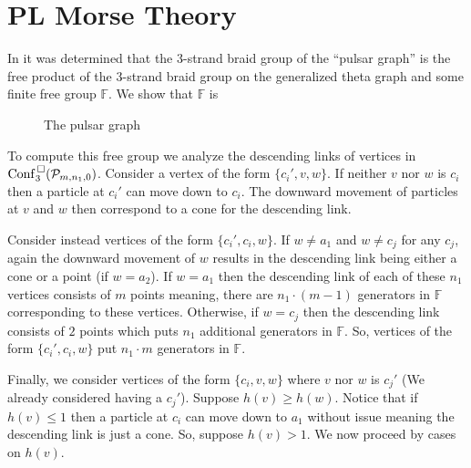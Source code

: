 \chapter{PL Morse Theory}
In \cite{appiah2024algebraicstructurehyperbolicgraph} it was determined that the 3-strand braid group of the ``pulsar graph''
is the free product of the 3-strand braid group on the generalized theta graph and some finite free group \(\mathbb{F}\).
We show that \(\mathbb{F}\) is %

\begin{figure}
\centering
\begin{tikzpicture}
\end{tikzpicture}
\label{fig:pulsargraph}
\caption{The pulsar graph}
\end{figure}

To compute this free group we analyze the descending links of vertices in \(\DConf_3(\mathcal{P}_{m,n_1,0})\).
Consider a vertex of the form \(\{c_i', v, w\}\).
If neither \(v\) nor \(w\) is \(c_i\)
then a particle at \(c_i'\) can move down to \(c_i\).
The downward movement of particles at \(v\) and \(w\) then correspond to a cone for the descending link.

Consider instead vertices of the form \(\{c_i', c_i, w\}\).
If \(w \neq a_1\) and \(w \neq c_j\) for any \(c_j\),
again the downward movement of \(w\) results in the descending link being either a cone or a point (if \(w = a_2\)).
If \(w = a_1\) then the descending link of each of these \(n_1\) vertices consists of \(m\) points
meaning, there are \(n_1 \cdot (m - 1)\) generators in \(\mathbb{F}\) corresponding to these vertices.
Otherwise, if \(w = c_j\) then the descending link consists of \(2\) points which puts \(n_1\) additional generators in \(\mathbb{F}\).
So, vertices of the form \(\{c_i', c_i, w\}\) put \(n_1 \cdot m\) generators in \(\mathbb{F}\).

Finally, we consider vertices of the form \(\{c_i, v, w\}\) where \(v\) nor \(w\) is \(c_j'\) (We already considered having a \(c_j'\)).
Suppose \(h(v) \ge h(w)\).
Notice that if \(h(v) \le 1\) then a particle at \(c_i\) can move down to \(a_1\) without issue meaning the descending link is just a cone.
So, suppose \(h(v) > 1\).
We now proceed by cases on \(h(v)\).

